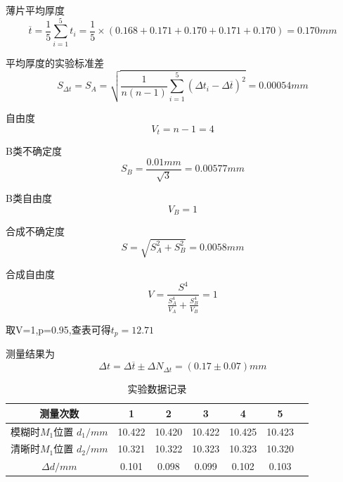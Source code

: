 \documentclass[12pt,a4paper,UTF8]{ctexart}
\begin{document}
薄片平均厚度
\begin{equation*}
	\overline{t}= \frac{1}{5}\sum_{i = 1}^{5}  t_i=\frac{1}{5} \times (0.168 + 0.171 + 0.170 + 0.171 + 0.170 )=0.170mm
\end{equation*} 

平均厚度的实验标准差
\begin{equation*}
	S_{\varDelta t}=S_A=\sqrt{\frac{1}{n(n-1)}\sum_{i = 1}^{5}(\varDelta t_i-\varDelta \overline{t})^{2}} =0.00054mm
\end{equation*}

自由度
\begin{equation*}
	V_t=n-1=4
\end{equation*}

B类不确定度
\begin{equation*}
	S_B=\frac{0.01mm}{\sqrt{3}}=0.00577mm
\end{equation*}

B类自由度
\begin{equation*}
	V_B=1
\end{equation*}

合成不确定度
\begin{equation*}
	S= \sqrt{S_A^2+S_B^2}=0.0058mm
\end{equation*}

合成自由度
\begin{equation*}
	V=\frac{S^4}{ \frac{S_A^4}{V_A}+ \frac{S_B^4}{V_B}}=1
\end{equation*}

取V=1,p=0.95,查表可得$t_p=12.71$

测量结果为
\begin{equation*}
	\varDelta t=\varDelta \overline{t}\pm \varDelta N_{\varDelta t}=(0.17\pm0.07)mm
\end{equation*}


\begin{table}[htbp]
	\centering
	\caption{实验数据记录}
	\begin{tabular}{ccccccc}
	\toprule
    测量次数 & 1 & 2 & 3 & 4 & 5  \\
	\midrule
    模糊时$M_1$位置 $d_1/mm$ & 10.422 & 10.420 & 10.422 & 10.425 & 10.423 \\
    清晰时$M_1$位置 $d_2/mm $ & 10.321 & 10.322 & 10.323 & 10.323 & 10.320 \\
	$\varDelta d /mm$ & 0.101 & 0.098 & 0.099 & 0.102 & 0.103 \\
	\bottomrule
	\end{tabular}%
	\label{tab:device}%
\end{table}%
\end{document}
